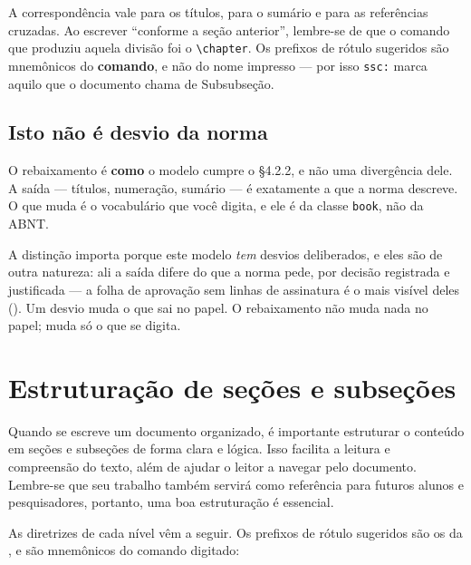 A correspondência vale para os títulos, para o sumário e para as referências cruzadas. Ao escrever
``conforme a seção anterior'', lembre-se de que o comando que produziu aquela divisão foi o
\texttt{\textbackslash chapter}. Os prefixos de rótulo sugeridos são mnemônicos do \textbf{comando},
e não do nome impresso --- por isso \texttt{ssc:} marca aquilo que o documento chama de Subsubseção.

\subsection{Isto não é desvio da norma}\label{ssc:rebaixamento-nao-e-desvio}

O rebaixamento é \textbf{como} o modelo cumpre o §4.2.2, e não uma divergência dele. A saída ---
títulos, numeração, sumário --- é exatamente a que a norma descreve. O que muda é o vocabulário que
você digita, e ele é da classe \texttt{book}, não da ABNT.

A distinção importa porque este modelo \emph{tem} desvios deliberados, e eles são de outra natureza:
ali a saída difere do que a norma pede, por decisão registrada e justificada --- a folha de aprovação
sem linhas de assinatura é o mais visível deles (). Um desvio muda o que
sai no papel. O rebaixamento não muda nada no papel; muda só o que se digita.

\section{Estruturação de seções e subseções}\label{sec:secoes-desenvolvimento}

Quando se escreve um documento organizado, é importante estruturar o conteúdo em seções e subseções
de forma clara e lógica. Isso facilita a leitura e compreensão do texto, além de ajudar o leitor a
navegar pelo documento. Lembre-se que seu trabalho também servirá como referência para futuros
alunos e pesquisadores, portanto, uma boa estruturação é essencial.

As diretrizes de cada nível vêm a seguir. Os prefixos de rótulo sugeridos são os da
, e são mnemônicos do comando digitado:


